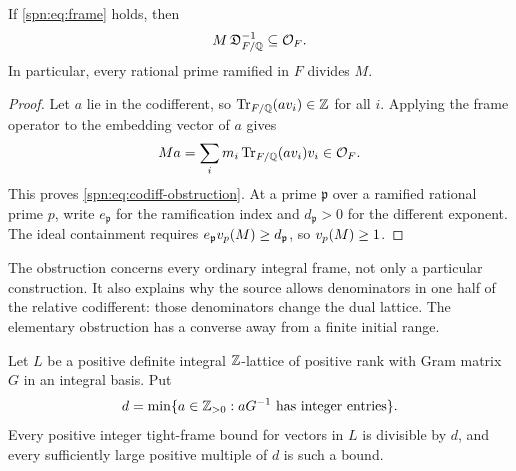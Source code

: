 \begin{theorem}\label{spn:thm:dual-obstruction}
If \eqref{spn:eq:frame} holds, then
\begin{equation}\label{spn:eq:codiff-obstruction}
 M\,\mathfrak{D}_{F/\mathbb{Q}}^{-1}\subseteq\mathcal{O}_F .
\end{equation}
In particular, every rational prime ramified in $F$ divides $M$.
\end{theorem}

\begin{proof}
Let $a$ lie in the codifferent, so $\operatorname{Tr}_{F/\mathbb{Q}}(av_i)\in\mathbb{Z}$ for all $i$.
Applying the frame operator to the embedding vector of $a$ gives
\[
 Ma=\sum_im_i\operatorname{Tr}_{F/\mathbb{Q}}(av_i)v_i\in\mathcal{O}_F .
\]
This proves \eqref{spn:eq:codiff-obstruction}. At a prime $\mathfrak p$ over a
ramified rational prime $p$, write $e_{\mathfrak p}$ for the ramification
index and $d_{\mathfrak p}>0$ for the different exponent. The ideal
containment requires $e_{\mathfrak p}v_p(M)\ge d_{\mathfrak p}$, so
$v_p(M)\ge1$.
\end{proof}

The obstruction concerns every ordinary integral frame, not only a particular
construction. It also explains why the source allows denominators in one half
of the relative codifferent: those denominators change the dual lattice. The
elementary obstruction has a converse away from a finite initial range.

\begin{theorem}\label{spn:thm:real-eventual}
Let $L$ be a positive definite integral $\mathbb{Z}$-lattice of positive rank with
Gram matrix $G$ in an integral basis. Put
\[
 d=\min\{a\in\mathbb{Z}_{>0}: aG^{-1}\text{ has integer entries}\} .
\]
Every positive integer tight-frame bound for vectors in $L$ is divisible by
$d$, and every sufficiently large positive multiple of $d$ is such a bound.
\end{theorem}

